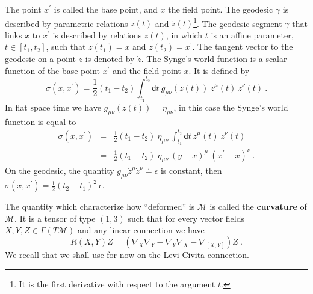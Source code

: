 \documentclass[10pt]{book}
\let\int\int
\newcommand{\Mcal}{\mathcal{M}}
\newcommand{\dsf}{\mathsf{d}}
\theoremstyle{break}
\begin{document}
\bigskip


The point $x^\prime$ is called the base point, and $x$ the field point. The geodesic $\gamma$ is described by parametric relations $z(t)$ and $\dot{z}(t)$\footnote{It is the first derivative with respect to the argument $t$.}.
The geodesic segment $\gamma$ that links $x$ to $x^\prime$ is described by relations $z(t)$, in which $t$ is an affine parameter, $t \in \left[ t_1 , t_2 \right]$, such that $z(t_1) = x$ and $z(t_2) = x^\prime$. The tangent vector to the geodesic on a point $z$ is denoted by $\dot{z}$. The Synge's world function is a scalar function of the base point $x^\prime$ and the field point $x$. It is defined by
%
\begin{equation*}
\sigma(x,x^\prime) =  \frac{1}{2} (t_1 - t_2) \int_{t_1}^{t_2} \dsf t \ g_{\mu \nu} \left( z(t) \right) \ \dot{z}^\mu(t) \ \dot{z}^{\nu}(t) \ .
\end{equation*}
%
In flat space time we have $g_{\mu \nu} \left( z(t) \right) = \eta_{\mu \nu}$, in this case the Synge's world function is equal to
%
\begin{eqnarray*}
\sigma(x,x^\prime) &=& \frac{1}{2} (t_1 - t_2) \ \eta_{\mu \nu} \ \int_{t_1}^{t_2} \dsf t \ \dot{z}^\mu(t) \ \dot{z}^{\nu}(t) \\
&=& \frac{1}{2} (t_1 - t_2) \ \eta_{\mu \nu} \ (y-x)^\mu \ (x^\prime-x)^\nu \ .
\end{eqnarray*}
%
On the geodesic, the quantity $g_{\mu \nu} \dot{z}^\mu \dot{z}^\nu \doteq \epsilon$ is constant, then $\sigma(x,x^\prime) = \frac{1}{2} (t_2-t_1)^2 \ \epsilon$.


\bigskip

The quantity which characterize how ``deformed'' is $\Mcal$ is called the \textbf{curvature} of $\Mcal$. It is a tensor of type $(1,3)$ such that for every vector fields $X, Y, Z \in \Gamma(T\Mcal)$ and any linear connection we have
%
\begin{equation*}
R(X,Y)Z = \left( \nabla_X \nabla_Y - \nabla_Y \nabla_X - \nabla_{[X,Y]} \right) Z \ .
\end{equation*}
%
We recall that we shall use for now on the Levi Civita connection. %
%
%
\end{document}
